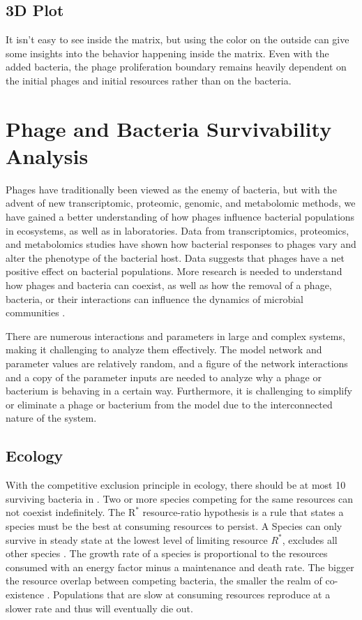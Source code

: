 \subsection{3D Plot}
It isn't easy to see inside the matrix, but using the color on the outside can give some insights into the behavior happening inside the matrix. 
Even with the added bacteria, the phage proliferation boundary remains heavily dependent on the initial phages and initial resources rather than on the bacteria. 

\section{Phage and Bacteria Survivability Analysis}
Phages have traditionally been viewed as the enemy of bacteria, but with the advent of new transcriptomic, proteomic, genomic, and metabolomic methods, we have gained a better understanding of how phages influence bacterial populations in ecosystems, as well as in laboratories. 
Data from transcriptomics, proteomics, and metabolomics studies have shown how bacterial responses to phages vary and alter the phenotype of the bacterial host. 
Data suggests that phages have a net positive effect on bacterial populations. 
More research is needed to understand how phages and bacteria can coexist, as well as how the removal of a phage, bacteria, or their interactions can influence the dynamics of microbial communities \cite{fernandezPhageFoeInsight2018}. 

There are numerous interactions and parameters in large and complex systems, making it challenging to analyze them effectively. 
The model network and parameter values are relatively random, and a figure of the network interactions and a copy of the parameter inputs are needed to analyze why a phage or bacterium is behaving in a certain way. 
Furthermore, it is challenging to simplify or eliminate a phage or bacterium from the model due to the interconnected nature of the system. 

\subsection{Ecology}
With the competitive exclusion principle in ecology, there should be at most 10 surviving bacteria in  \cite{hardinCompetitiveExclusionPrinciple1960}. 
Two or more species competing for the same resources can not coexist indefinitely. 
The $\text{R}^{*}$ resource-ratio hypothesis is a rule that states a species must be the best at consuming resources to persist. 
A Species can only survive in steady state at the lowest level of limiting resource $R^{*}$, excludes all other species \cite{juRuleEnergyFlux2009}. 
The growth rate of a species is proportional to the resources consumed with an energy factor minus a maintenance and death rate. 
The bigger the resource overlap between competing bacteria, the smaller the realm of co-existence \cite{vandenbergEcologicalModellingApproaches2022}. 
Populations that are slow at consuming resources reproduce at a slower rate and thus will eventually die out. 

